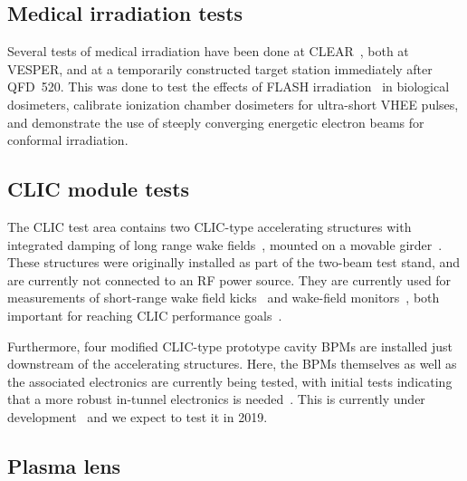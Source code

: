 \documentclass[a4paper,
               keeplastbox,   %
               ]{jacow}
\begin{document}
\subsection{Medical irradiation tests}
Several tests of medical irradiation have been done at CLEAR~\cite{Wilfrid::CLEARrev}, both at VESPER, and at a temporarily constructed target station immediately after QFD~520.
This was done to test the effects of FLASH irradiation~\cite{FLASH2017} in biological dosimeters, calibrate ionization chamber dosimeters for ultra-short VHEE pulses, and demonstrate the use of steeply converging energetic electron beams for conformal irradiation.

\subsection{CLIC module tests}
The CLIC test area contains two CLIC-type accelerating structures with integrated damping of long range wake fields~\cite{Grudiev:TD26}, mounted on a movable girder~\cite{Durand-mover::AccelAlign12,Sosin-mover::IPAC12}.
These structures were originally installed as part of the two-beam test stand, and are currently not connected to an RF power source.
They are currently used for measurements of short-range wake field kicks~\cite{Antonio::IEEE-Kicks} and wake-field monitors~\cite{KyrreSjobak::CLICWS19}, both important for reaching CLIC performance goals~\cite{CLIC-CDR,CLIC-PIP}.


Furthermore, four modified CLIC-type prototype cavity BPMs are installed just downstream of the accelerating structures.
Here, the BPMs themselves as well as the associated electronics are currently being tested, with initial tests indicating that a more robust in-tunnel electronics is needed~\cite{NadenauThesis}.
This is currently under development~\cite{AlexejLyapin::CLICWS19} and we expect to test it in 2019.

\subsection{Plasma lens}
\end{document}
